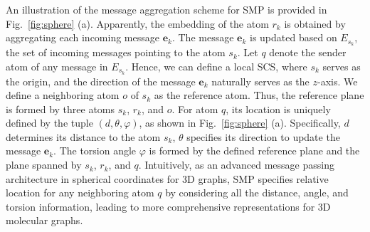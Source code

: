 \documentclass{article}
\begin{document}
An illustration of the message aggregation scheme 
for SMP is provided in Fig.~\ref{fig:sphere} (a).
Apparently, the embedding of the atom $r_k$ is
obtained by aggregating each incoming message $\mathbf{e}_k$.
The message $\mathbf{e}_k$ is updated based on $E_{s_k}$,
the set of incoming messages pointing to the atom $s_k$.
Let $q$ denote the sender atom of any message in $E_{s_k}$.
Hence, we can define a local SCS,
where $s_k$ serves as the origin,
and the direction of the message  $\mathbf{e}_k$ naturally serves as the $z$-axis.
We define a neighboring atom $o$ of $s_k$ as the reference atom. Thus, 
the reference plane is formed by three atoms $s_k$, $r_k$, and $o$.
For atom $q$, its location is uniquely defined by 
the tuple $(d, \theta, \varphi)$, as shown 
in Fig.~\ref{fig:sphere} (a).
Specifically, 
$d$ determines its distance to the atom $s_k$, $\theta$
specifies its direction to update the message $\mathbf{e}_k$.
The torsion angle $\varphi$ is formed by the defined reference plane and the plane spanned by $s_k$, $r_k$, and $q$. Intuitively, as an advanced message passing architecture in spherical coordinates for 3D graphs, SMP specifies relative location for any neighboring atom $q$ by considering all the distance, angle, and torsion information, leading to more comprehensive representations for 3D molecular graphs.
\end{document}
